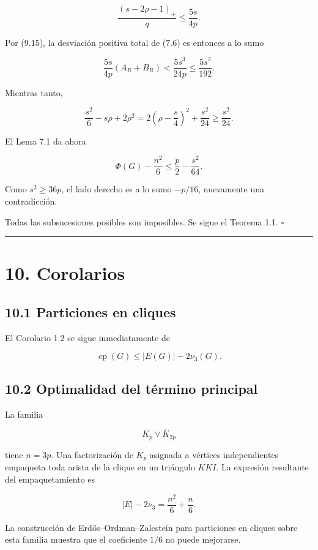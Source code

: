 \documentclass[
  11pt,
]{article}
\begin{document}
\[
\frac{(s-2\rho-1)_+}{q}
\le
\frac{5s}{4p}.
\tag{9.17}
\]

Por (9.15), la desviación positiva total de (7.6) es entonces a lo sumo

\[
\frac{5s}{4p}(A_R+B_R)
<
\frac{5s^3}{24p}
\le
\frac{5s^2}{192}.
\tag{9.18}
\]

Mientras tanto,

\[
\frac{s^2}{6}-s\rho+2\rho^2
=
2\left(\rho-\frac s4\right)^2+\frac{s^2}{24}
\ge
\frac{s^2}{24}.
\tag{9.19}
\]

El Lema 7.1 da ahora

\[
\Phi(G)-\frac{n^2}{6}
\le
\frac p2-\frac{s^2}{64}.
\tag{9.20}
\]

Como \(s^2\ge36p\), el lado derecho es a lo sumo \(-p/16\), nuevamente
una contradicción.

Todas las subsucesiones posibles son imposibles. Se sigue el Teorema
1.1. \(\square\)

\begin{center}\rule{0.5\linewidth}{0.5pt}\end{center}

\section{10. Corolarios}\label{corolarios}

\subsection{10.1 Particiones en cliques}\label{particiones-en-cliques}

El Corolario 1.2 se sigue inmediatamente de

\[
\operatorname{cp}(G)
\le
|E(G)|-2\nu_3(G).
\]

\subsection{10.2 Optimalidad del término
principal}\label{optimalidad-del-tuxe9rmino-principal}

La familia

\[
K_p\vee\overline K_{2p}
\]

tiene \(n=3p\). Una factorización de \(K_p\) asignada a vértices
independientes empaqueta toda arista de la clique en un triángulo
\(KKI\). La expresión resultante del empaquetamiento es

\[
|E|-2\nu_3
=
\frac{n^2}{6}+\frac n6.
\tag{10.1}
\]

La construcción de Erdős--Ordman--Zalcstein para particiones en cliques
sobre esta familia muestra que el coeficiente \(1/6\) no puede
mejorarse.
\end{document}
